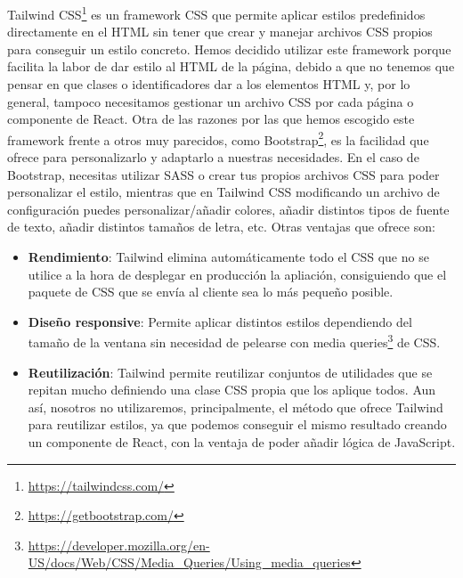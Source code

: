 Tailwind CSS\footnote{\url{https://tailwindcss.com/}} es un framework CSS que permite aplicar estilos predefinidos directamente en el HTML sin tener que crear y manejar archivos CSS propios para conseguir un estilo concreto. Hemos decidido utilizar este framework porque facilita la labor de dar estilo al HTML de la página, debido a que no tenemos que pensar en que clases o identificadores dar a los elementos HTML y, por lo general, tampoco necesitamos gestionar un archivo CSS por cada página o componente de React. Otra de las razones por las que hemos escogido este framework frente a otros muy parecidos, como Bootstrap\footnote{\url{https://getbootstrap.com/}}, es la facilidad que ofrece para personalizarlo y adaptarlo a nuestras necesidades. En el caso de Bootstrap, necesitas utilizar SASS o crear tus propios archivos CSS para poder personalizar el estilo, mientras que en Tailwind CSS modificando un archivo de configuración puedes personalizar/añadir colores, añadir distintos tipos de fuente de texto, añadir distintos tamaños de letra, etc. Otras ventajas que ofrece son:
\begin{itemize}
  \item \textbf{Rendimiento}: Tailwind elimina automáticamente todo el CSS que no se utilice a la hora de desplegar en producción la apliación, consiguiendo que el paquete de CSS que se envía al cliente sea lo más pequeño posible.
  \item \textbf{Diseño responsive}: Permite aplicar distintos estilos dependiendo del tamaño de la ventana sin necesidad de pelearse con media queries\footnote{\url{https://developer.mozilla.org/en-US/docs/Web/CSS/Media_Queries/Using_media_queries}} de CSS.
  \item \textbf{Reutilización}: Tailwind permite reutilizar conjuntos de utilidades que se repitan mucho definiendo una clase CSS propia que los aplique todos. Aun así, nosotros no utilizaremos, principalmente, el método que ofrece Tailwind para reutilizar estilos, ya que podemos conseguir el mismo resultado creando un componente de React, con la ventaja de poder añadir lógica de JavaScript.
\end{itemize}


